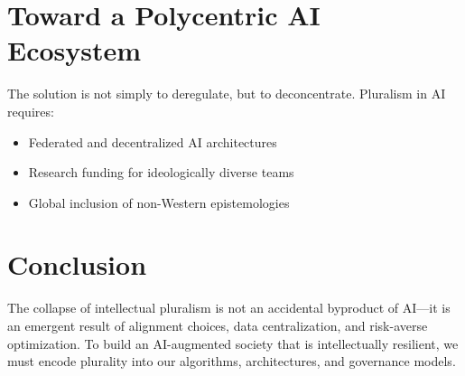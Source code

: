 \documentclass[11pt]{article}
\begin{document}
\section{Toward a Polycentric AI Ecosystem}
The solution is not simply to deregulate, but to deconcentrate. Pluralism in AI requires:
\begin{itemize}
    \item Federated and decentralized AI architectures
    \item Research funding for ideologically diverse teams
    \item Global inclusion of non-Western epistemologies
\end{itemize}

\section{Conclusion}
The collapse of intellectual pluralism is not an accidental byproduct of AI—it is an emergent result of alignment choices, data centralization, and risk-averse optimization. To build an AI-augmented society that is intellectually resilient, we must encode plurality into our algorithms, architectures, and governance models.



\end{document}
